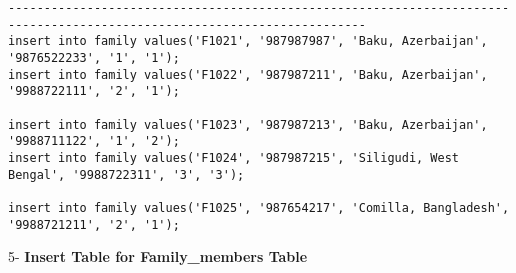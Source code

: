 \documentclass[a4,12pt]{report}
\begin{document}
\begin{lstlisting}
------------------------------------------------------------------------------------------------------------------------
insert into family values('F1021', '987987987', 'Baku, Azerbaijan', '9876522233', '1', '1');
insert into family values('F1022', '987987211', 'Baku, Azerbaijan', '9988722111', '2', '1');

insert into family values('F1023', '987987213', 'Baku, Azerbaijan', '9988711122', '1', '2');
insert into family values('F1024', '987987215', 'Siligudi, West Bengal', '9988722311', '3', '3');

insert into family values('F1025', '987654217', 'Comilla, Bangladesh', '9988721211', '2', '1');

\end{lstlisting}

\begin{flushleft}
5- \textbf{ Insert Table for Family\_members Table}
\end{flushleft}
\end{document}
